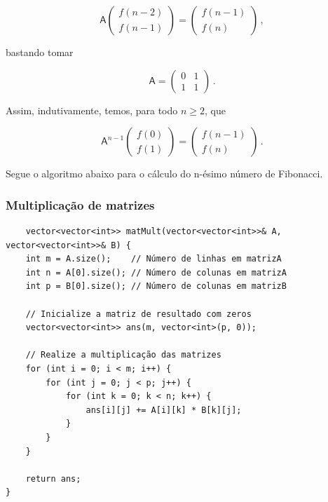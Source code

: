 \begin{equation*}
\mathsf A\begin{pmatrix}
f(n-2)\\
f(n-1)
\end{pmatrix}=
\begin{pmatrix}
f(n-1)\\
f(n)
\end{pmatrix}\,,
\end{equation*}

bastando tomar

\begin{equation*}
\mathsf A=\begin{pmatrix}
0 & 1\\
1 & 1
\end{pmatrix}\,.
\end{equation*}

Assim, indutivamente, temos, para todo $n\geq2$, que

\begin{equation*}
\label{eqfibm}
\mathsf A^{n-1}\begin{pmatrix}
f(0)\\
f(1)
\end{pmatrix}=
\begin{pmatrix}
f(n-1)\\
f(n)
\end{pmatrix}\,.
\end{equation*}

Segue o algoritmo abaixo para o cálculo do n-ésimo número de Fibonacci.

\subsubsection{Multiplicação de matrizes}

\begin{verbatim}    
    vector<vector<int>> matMult(vector<vector<int>>& A, vector<vector<int>>& B) {
    int m = A.size();    // Número de linhas em matrizA
    int n = A[0].size(); // Número de colunas em matrizA
    int p = B[0].size(); // Número de colunas em matrizB

    // Inicialize a matriz de resultado com zeros
    vector<vector<int>> ans(m, vector<int>(p, 0));

    // Realize a multiplicação das matrizes
    for (int i = 0; i < m; i++) {
        for (int j = 0; j < p; j++) {
            for (int k = 0; k < n; k++) {
                ans[i][j] += A[i][k] * B[k][j];
            }
        }
    }

    return ans;
}
\end{verbatim}

